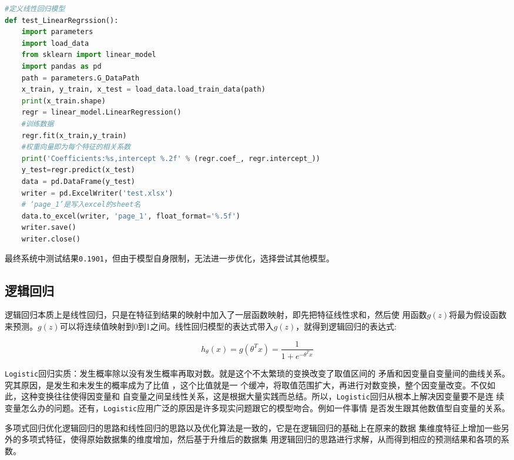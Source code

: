 \documentclass[11pt,a4paper]{elegantpaper}
\begin{document}
\begin{multicols}{2}
\begin{lstlisting}[language=Python]
#定义线性回归模型
def test_LinearRegrssion():
    import parameters
    import load_data
    from sklearn import linear_model
    import pandas as pd 
    path = parameters.G_DataPath
    x_train, y_train, x_test = load_data.load_train_data(path)
    print(x_train.shape)
    regr = linear_model.LinearRegression()
    #训练数据
    regr.fit(x_train,y_train)
    #权重向量即为每个特征的相关系数
    print('Coefficients:%s,intercept %.2f' % (regr.coef_, regr.intercept_))
    y_test=regr.predict(x_test)
    data = pd.DataFrame(y_test)
    writer = pd.ExcelWriter('test.xlsx')
    # ‘page_1’是写入excel的sheet名
    data.to_excel(writer, 'page_1', float_format='%.5f')       
    writer.save()
    writer.close()
\end{lstlisting}

最终系统中测试结果\lstinline{0.1901}，但由于模型自身限制，无法进一步优化，选择尝试其他模型。

\subsection{逻辑回归}

逻辑回归本质上是线性回归，只是在特征到结果的映射中加入了一层函数映射，即先把特征线性求和，然后使
用函数$g(z)$将最为假设函数来预测。$g(z)$可以将连续值映射到0到1之间。线性回归模型的表达式带入$g(z)$，就得到逻辑回归的表达式:

$$
h_{\theta}(x)=g\left(\theta^{T} x\right)=\frac{1}{1+e^{-\theta^{T} x}}
$$

\lstinline{Logistic}回归实质：发生概率除以没有发生概率再取对数。就是这个不太繁琐的变换改变了取值区间的
矛盾和因变量自变量间的曲线关系。究其原因，是发生和未发生的概率成为了比值 ，这个比值就是一
个缓冲，将取值范围扩大，再进行对数变换，整个因变量改变。不仅如此，这种变换往往使得因变量和
自变量之间呈线性关系，这是根据大量实践而总结。所以，\lstinline{Logistic}回归从根本上解决因变量要不是连
续变量怎么办的问题。还有，\lstinline{Logistic}应用广泛的原因是许多现实问题跟它的模型吻合。例如一件事情
是否发生跟其他数值型自变量的关系。

多项式回归优化逻辑回归的思路和线性回归的思路以及优化算法是一致的，它是在逻辑回归的基础上在原来的数据
集维度特征上增加一些另外的多项式特征，使得原始数据集的维度增加，然后基于升维后的数据集
用逻辑回归的思路进行求解，从而得到相应的预测结果和各项的系数。


\end{multicols}
\end{document}
